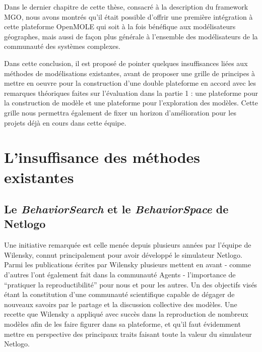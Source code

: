 

Dans le dernier chapitre de cette thèse, consacré à la description du framework MGO, nous avons montrés qu'il était possible d'offrir une première intégration à cette plateforme OpenMOLE qui soit à la fois bénéfique aux modélisateurs géographes, mais aussi de façon plus générale à l'ensemble des modélisateurs de la communauté des systèmes complexes. 

Dans cette conclusion, il est proposé de pointer quelques insuffisances liées aux méthodes de modélisations existantes, avant de proposer une grille de principes à mettre en oeuvre pour la construction d'une double plateforme en accord avec les remarques théoriques faites sur l'évaluation dans la partie 1 : une plateforme pour la construction de modèle et une plateforme pour l'exploration des modèles. Cette grille nous permettra également de fixer un horizon d'amélioration pour les projets déjà en cours dans cette équipe. 

\section{L'insuffisance des méthodes existantes}
\label{sec:insuffisance_plateformes}

\subsection{Le \textit{BehaviorSearch} et le \textit{BehaviorSpace} de Netlogo}

Une initiative remarquée est celle menée depuis plusieurs années par l'équipe de Wilensky, connut principalement pour avoir développé le simulateur Netlogo. Parmi les publications écrites par Wilensky plusieurs mettent en avant \autocite{Wilensky2007a} - comme d'autres l'ont également fait dans la communauté Agents \autocites{Rouchier2013, Axtell1996} - l'importance de \enquote{pratiquer la reproductibilité} pour nous et pour les autres. Un des objectifs visés étant la constitution d'une communauté scientifique capable de dégager de nouveaux savoirs par le partage et la discussion collective des modèles. Une recette que Wilensky a appliqué avec succès dans la reproduction de nombreux modèles afin de les faire figurer dans sa plateforme, et qu'il faut évidemment mettre en perspective des principaux traits faisant toute la valeur du simulateur Netlogo. 

